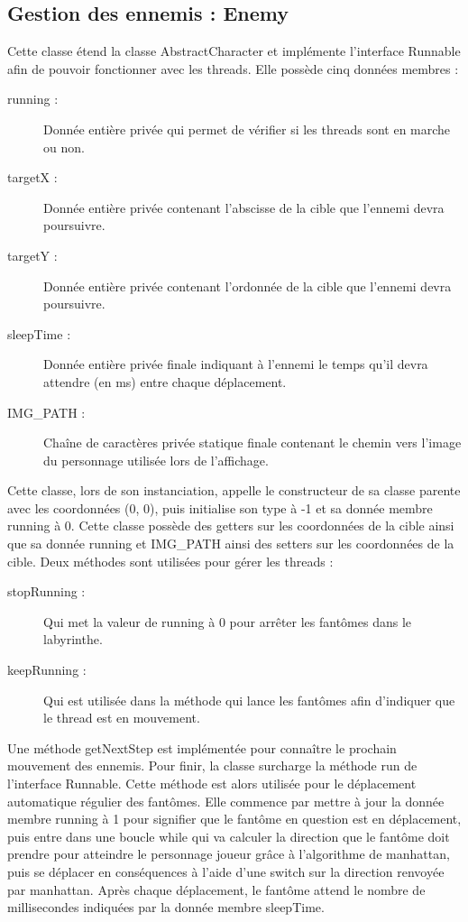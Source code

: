 \documentclass [10pt, a4paper]{article}
\begin{document}
\subsection {Gestion des ennemis : Enemy}
Cette classe étend la classe AbstractCharacter et implémente l'interface Runnable afin de pouvoir fonctionner avec les threads. Elle possède cinq données membres :
\begin {description}
\item  [running :]   Donnée entière privée qui permet de vérifier si les threads sont en marche ou non.
\item  [targetX :]   Donnée entière privée contenant l'abscisse de la cible que l'ennemi devra poursuivre.
\item  [targetY :]   Donnée entière privée contenant l'ordonnée de la cible que l'ennemi devra poursuivre.
\item  [sleepTime :] Donnée entière privée finale indiquant à l'ennemi le temps qu'il devra attendre (en ms) entre chaque déplacement.
\item  [IMG\_PATH :] Chaîne de caractères privée statique finale contenant le chemin vers l'image du personnage utilisée lors de l'affichage.
\end   {description}


Cette classe, lors de son instanciation, appelle le constructeur de sa classe parente avec les coordonnées (0, 0), puis initialise son type à -1 et sa donnée membre running à 0. Cette classe possède des getters sur les coordonnées de la cible ainsi que sa donnée running et IMG\_PATH ainsi des setters sur les coordonnées de la cible. Deux méthodes sont utilisées pour gérer les threads :
\begin {description}
\item  [stopRunning :] Qui met la valeur de running à 0 pour arrêter les fantômes dans le labyrinthe.
\item  [keepRunning :] Qui est utilisée dans la méthode qui lance les fantômes afin d'indiquer que le thread est en mouvement.
\end   {description}


Une méthode getNextStep est implémentée pour connaître le prochain mouvement des ennemis. Pour finir, la classe surcharge la méthode run de l'interface Runnable. Cette méthode est alors utilisée pour le déplacement automatique régulier des fantômes. Elle commence par mettre à jour la donnée membre running à 1 pour signifier que le fantôme en question est en déplacement, puis entre dans une boucle while qui va calculer la direction que le fantôme doit prendre pour atteindre le personnage joueur grâce à l'algorithme de manhattan, puis se déplacer en conséquences à l'aide d'une switch sur la direction renvoyée par manhattan. Après chaque déplacement, le fantôme attend le nombre de millisecondes indiquées par la donnée membre sleepTime.
\end{document}
